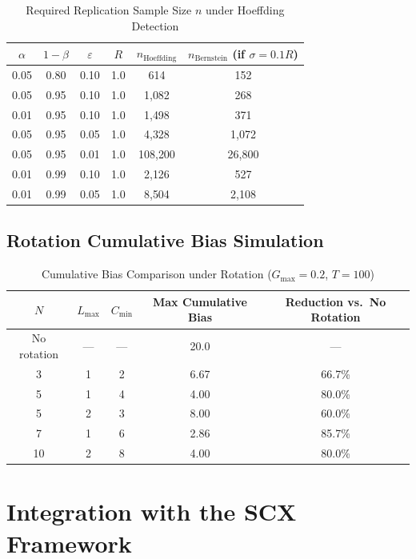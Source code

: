 \documentclass[11pt,a4paper]{article}
\theoremstyle{definition}
\begin{document}
\begin{table}[htbp]
\centering
\caption{Required Replication Sample Size $n$ under Hoeffding Detection}
\label{tab:sample_complexity}
\begin{tabular}{@{}cccccc@{}}
\toprule
$\alpha$ & $1-\beta$ & $\varepsilon$ & $R$ & $n_{\text{Hoeffding}}$ & $n_{\text{Bernstein}}$ (if $\sigma=0.1R$) \\
\midrule
0.05 & 0.80 & 0.10 & 1.0 & 614 & 152 \\
0.05 & 0.95 & 0.10 & 1.0 & 1{,}082 & 268 \\
0.01 & 0.95 & 0.10 & 1.0 & 1{,}498 & 371 \\
0.05 & 0.95 & 0.05 & 1.0 & 4{,}328 & 1{,}072 \\
0.05 & 0.95 & 0.01 & 1.0 & 108{,}200 & 26{,}800 \\
0.01 & 0.99 & 0.10 & 1.0 & 2{,}126 & 527 \\
0.01 & 0.99 & 0.05 & 1.0 & 8{,}504 & 2{,}108 \\
\bottomrule
\end{tabular}
\end{table}

\subsection{Rotation Cumulative Bias Simulation}

\begin{table}[htbp]
\centering
\caption{Cumulative Bias Comparison under Rotation ($G_{\max}=0.2$, $T=100$)}
\label{tab:rotation_sim}
\begin{tabular}{@{}ccccc@{}}
\toprule
$N$ & $L_{\max}$ & $C_{\min}$ & Max Cumulative Bias & Reduction vs.\ No Rotation \\
\midrule
No rotation & --- & --- & 20.0 & --- \\
3 & 1 & 2 & 6.67 & 66.7\% \\
5 & 1 & 4 & 4.00 & 80.0\% \\
5 & 2 & 3 & 8.00 & 60.0\% \\
7 & 1 & 6 & 2.86 & 85.7\% \\
10 & 2 & 8 & 4.00 & 80.0\% \\
\bottomrule
\end{tabular}
\end{table}

\section{Integration with the SCX Framework}
\end{document}
